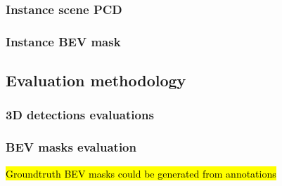 \subsubsection{Instance scene PCD}

\subsubsection{Instance BEV mask}

\subsection{Evaluation methodology}
\label{evaluacion}

\subsubsection{3D detections evaluations}
\subsubsection{BEV masks evaluation}
\hl{Groundtruth BEV masks could be generated from annotations}


